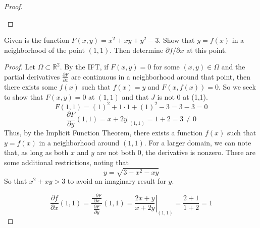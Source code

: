 \documentclass[12pt]{article}
\newcommand{\R}{\mathbb{R}}
\newenvironment{problem}[2][Problem]{\begin{trivlist}
\item[\hskip \labelsep {\bfseries #1}\hskip \labelsep {\bfseries #2.}]}{\end{trivlist}}
\begin{document}
\begin{proof}
\begin{enumerate}
\end{enumerate}
\end{proof}

\begin{problem}{D1}
Given is the function $F(x,y)=x^2+xy+y^2-3.$ Show that $y=f(x)$ in a neighborhood of the point $(1,1)$. Then determine $\partial f/\partial x$ at this point.
\end{problem}

\begin{proof}
Let $\Omega\subset\R^2$. By the IFT, if $F(x,y)=0$ for some $(x,y)\in\Omega$ and the partial derivatives $\frac{\partial F}{\partial x}$ are continuous in a neighborhood around that point, then there exists some $f(x)$ such that $f(x)=y$ and $F(x,f(x))=0$. So we seek to show that $F(x,y)=0$ at $(1,1)$ and that $J$ is not $0$ at (1,1). 
    \[F(1,1)=(1)^2+1\cdot1+(1)^2-3=3-3=0\]
    \[\frac{\partial F}{\partial y}(1,1) = \left.x+2y\right|_{(1,1)}=1+2=3\not=0\]
Thus, by the Implicit Function Theorem, there exists a function $f(x)$ such that $y=f(x)$ in a neighborhood around $(1,1)$. For a larger domain, we can note that, as long as both $x$ and $y$ are not both $0$, the derivative is nonzero. There are some additional restrictions, noting that 
\[y=\sqrt{3-x^2-xy}\]
So that $x^2+xy>3$ to avoid an imaginary result for $y$.

\[\frac{\partial f}{\partial x}(1,1)=\frac{\frac{-\partial F}{\partial x}}{\frac{\partial F}{\partial y}}(1,1)=\left.\frac{2x+y}{x+2y}\right|_{(1,1)}=\frac{2+1}{1+2}=1\]
\end{proof}


    \begin{comment}
    f1x1\frac{1+x_2+x_3}{(1+x_1+x_2+x_3)^2} f1x2\frac{-x_1}{(1+x_1+x_2+x_3)^2} f1x3\frac{-x_1}{(1+x_1+x_2+x_3)^2}
    f2x1\frac{-x_2}{(1+x_1+x_2+x_3)^2} f2x2\frac{1+x_1+x_3}{(1+x_1+x_2+x_3)^2} f2x3\frac{-x_2}{(1+x_1+x_2+x_3)^2}
    f3x1\frac{-x_3}{(1+x_1+x_2+x_3)^2} f3x2\frac{-x_3}{(1+x_1+x_2+x_3)^2} f3x3\frac{1+x_1+x_2}{(1+x_1+x_2+x_3)^2}
    \end{comment}

\begin{comment}
\begin{problem}{x.yz}
Statement of problem goes here
\end{problem}
 
\begin{proof}
Proof goes here. Repeat as needed
\end{proof}
\end{comment}
\end{document}
